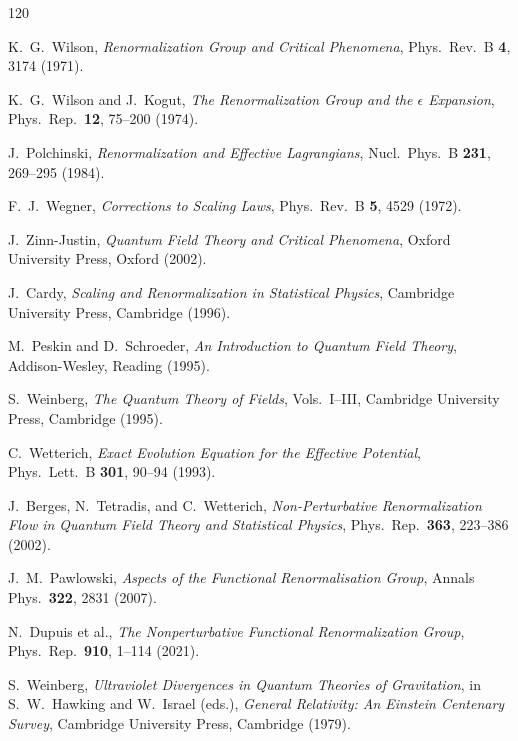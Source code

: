 \documentclass[12pt,a4paper]{article}
\begin{document}
\begin{thebibliography}{120}
\sloppy


K.~G.~Wilson,
\textit{Renormalization Group and Critical Phenomena},
Phys.\ Rev.\ B \textbf{4}, 3174 (1971).

K.~G.~Wilson and J.~Kogut,
\textit{The Renormalization Group and the $\epsilon$ Expansion},
Phys.\ Rep.\ \textbf{12}, 75--200 (1974).

J.~Polchinski,
\textit{Renormalization and Effective Lagrangians},
Nucl.\ Phys.\ B \textbf{231}, 269--295 (1984).

F.~J.~Wegner,
\textit{Corrections to Scaling Laws},
Phys.\ Rev.\ B \textbf{5}, 4529 (1972).

J.~Zinn-Justin,
\textit{Quantum Field Theory and Critical Phenomena},
Oxford University Press, Oxford (2002).

J.~Cardy,
\textit{Scaling and Renormalization in Statistical Physics},
Cambridge University Press, Cambridge (1996).

M.~Peskin and D.~Schroeder,
\textit{An Introduction to Quantum Field Theory},
Addison-Wesley, Reading (1995).

S.~Weinberg,
\textit{The Quantum Theory of Fields}, Vols.\ I--III,
Cambridge University Press, Cambridge (1995).


C.~Wetterich,
\textit{Exact Evolution Equation for the Effective Potential},
Phys.\ Lett.\ B \textbf{301}, 90--94 (1993).

J.~Berges, N.~Tetradis, and C.~Wetterich,
\textit{Non-Perturbative Renormalization Flow in Quantum Field Theory
and Statistical Physics},
Phys.\ Rep.\ \textbf{363}, 223--386 (2002).

J.~M.~Pawlowski,
\textit{Aspects of the Functional Renormalisation Group},
Annals Phys.\ \textbf{322}, 2831 (2007).

N.~Dupuis et al.,
\textit{The Nonperturbative Functional Renormalization Group},
Phys.\ Rep.\ \textbf{910}, 1--114 (2021).


S.~Weinberg,
\textit{Ultraviolet Divergences in Quantum Theories of Gravitation},
in S.~W.~Hawking and W.~Israel (eds.),
\textit{General Relativity: An Einstein Centenary Survey},
Cambridge University Press, Cambridge (1979).


\end{thebibliography}
\end{document}
